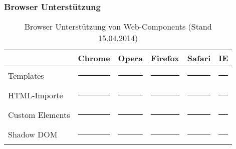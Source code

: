 \subsubsection{Browser Unterstützung}
\label{sec:3_WC_Support}


\begin{table}[h]
\centering
\begin{tabular}{ p{2cm} || p{2cm} | p{2cm} | p{2cm} | p{2cm} | p{2cm}}
& Chrome & Opera & Firefox & Safari & IE \\
\hline
\hline
Templates & {\color{green}\rule{1cm}{1cm}} & {\color{green}\rule{1cm}{1cm}} & {\color{green}\rule{1cm}{1cm}} & {\color{red}\rule{1cm}{1cm}} & {\color{red}\rule{1cm}{1cm}} \\
\hline
HTML-Importe & {\color{yellow}\rule{1cm}{1cm}} & {\color{yellow}\rule{1cm}{1cm}} & {\color{yellow}\rule{1cm}{1cm}} & {\color{red}\rule{1cm}{1cm}} & {\color{red}\rule{1cm}{1cm}}\\
\hline
Custom Elements & {\color{yellow}\rule{1cm}{1cm}} & {\color{yellow}\rule{1cm}{1cm}} & {\color{yellow}\rule{1cm}{1cm}} & {\color{red}\rule{1cm}{1cm}} & {\color{red}\rule{1cm}{1cm}}\\
\hline
Shadow DOM & {\color{green}\rule{1cm}{1cm}} & {\color{green}\rule{1cm}{1cm}} & {\color{yellow}\rule{1cm}{1cm}} & {\color{red}\rule{1cm}{1cm}} & {\color{red}\rule{1cm}{1cm}} \\
\end{tabular}
\caption[
Browser Unterstützung von Web-Components (Stand 15.04.2014)
]
{Browser Unterstützung von Web-Components (Stand 15.04.2014)}
\label{tab:BrowserSupport}
\end{table}
